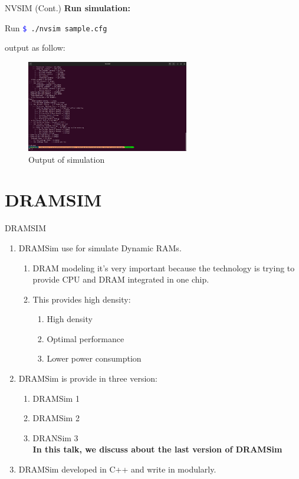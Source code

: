 \documentclass{beamer}
\begin{document}
\begin{frame}{NVSIM (Cont.)}
	\textbf{Run simulation: }
	
	\begin{block}{Run}
		\texttt{\textcolor{blue}{\$} ./nvsim sample.cfg} \\
	\end{block}
	
	output as follow:
	
	\begin{figure}
		\centering
		\includegraphics[height=4cm]{images/img8}
		\caption{Output of simulation}
		\label{fig:Output of simulation}
	\end{figure}
	
\end{frame}





\section{DRAMSIM}

\begin{frame}{DRAMSIM}
	\begin{enumerate}
		\item DRAMSim use for simulate Dynamic RAMs.
		\begin{enumerate}
			\item DRAM modeling it's very important because the technology is trying to provide CPU and DRAM integrated in one chip.
			\item This provides high density:
			\begin{enumerate}
				\item High density
				\item Optimal performance
				\item Lower power consumption
			\end{enumerate}
		\end{enumerate}
		\item DRAMSim is provide in three version:
		\begin{enumerate}
			\item DRAMSim 1
			\item DRAMSim 2
			\item DRANSim 3\\
			\textbf{In this talk, we discuss about the last version of DRAMSim}
		\end{enumerate}
		\item DRAMSim developed in C++ and write in modularly.
	\end{enumerate}
\end{frame}
\end{document}
